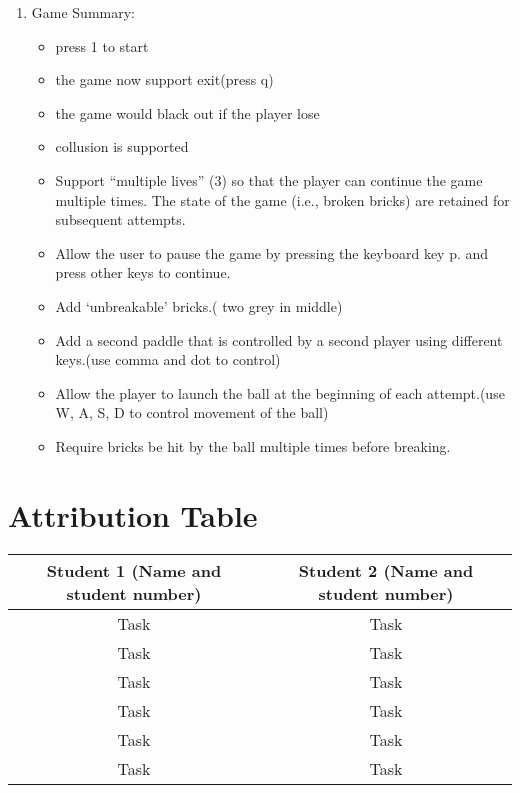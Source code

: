 \documentclass{article}
\begin{document}
\begin{enumerate}
\item Game Summary:
\begin{itemize}
\item press 1 to start
\item the game now support exit(press q)
\item the game would black out if the player lose
\item collusion is supported
\item Support “multiple lives” (3) so that the player can continue the game multiple times. The state of the game (i.e., broken bricks) are retained for subsequent attempts.
\item Allow the user to pause the game by pressing the keyboard key p. and press other keys to continue.
\item Add ‘unbreakable’ bricks.( two grey in middle)
\item Add a second paddle that is controlled by a second player using different keys.(use comma and dot to control)
\item Allow the player to launch the ball at the beginning of each attempt.(use W, A, S, D to control movement of the ball)
\item Require bricks be hit by the ball multiple times before breaking. 

\end{itemize}

    
\end{enumerate}

\section{Attribution Table}

\begin{center}
\begin{tabular}{|| c | c ||}
\hline
 Student 1 (Name and student number) &  Student 2 (Name and student number) \\ 
 \hline
 Task & Task\\
 \hline
 Task & Task\\
 \hline
 Task & Task\\ 
 \hline
 Task & Task\\ 
 \hline
 Task & Task\\
 \hline
 Task & Task\\  
 \hline
\end{tabular}
\end{center}

\end{document}
